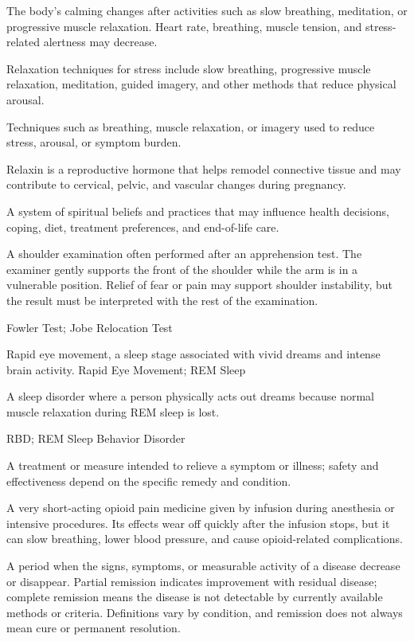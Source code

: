  The body's calming changes after activities such as slow breathing, meditation, or progressive muscle relaxation. Heart rate, breathing, muscle tension, and stress-related alertness may decrease.

 Relaxation techniques for stress include slow breathing, progressive muscle relaxation, meditation, guided imagery, and other methods that reduce physical arousal.

 Techniques such as breathing, muscle relaxation, or imagery used to reduce stress, arousal, or symptom burden.

 Relaxin is a reproductive hormone that helps remodel connective tissue and may contribute to cervical, pelvic, and vascular changes during pregnancy.

 A system of spiritual beliefs and practices that may influence health decisions, coping, diet, treatment preferences, and end-of-life care.

 A shoulder examination often performed after an apprehension test. The examiner gently supports the front of the shoulder while the arm is in a vulnerable position. Relief of fear or pain may support shoulder instability, but the result must be interpreted with the rest of the examination.

\synonyms
Fowler Test; Jobe Relocation Test

 Rapid eye movement, a sleep stage associated with vivid dreams and intense brain activity.
\synonyms
Rapid Eye Movement; REM Sleep

 A sleep disorder where a person physically acts out dreams because normal muscle relaxation during REM sleep is lost.

\synonyms
RBD; REM Sleep Behavior Disorder

 A treatment or measure intended to relieve a symptom or illness; safety and effectiveness depend on the specific remedy and condition.

 A very short-acting opioid pain medicine given by infusion during anesthesia or intensive procedures. Its effects wear off quickly after the infusion stops, but it can slow breathing, lower blood pressure, and cause opioid-related complications.

 A period when the signs, symptoms, or measurable activity of a disease decrease or disappear.
Partial remission indicates improvement with residual disease; complete remission means the disease
is not detectable by currently available methods or criteria. Definitions vary by condition, and
remission does not always mean cure or permanent resolution.

